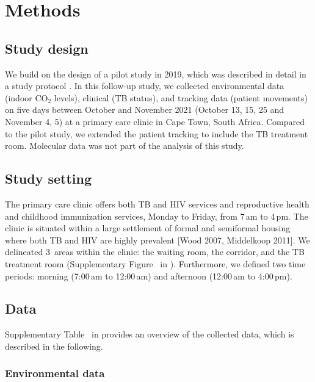 \documentclass[fleqn,11pt]{wlscirep}
\begin{document}
\newpage

\section{Methods}

\subsection{Study design}

We build on the design of a pilot study in 2019\cite{Zurcher2022JID}, which was described in detail in a study protocol \cite{Zurcher2020BMJ}. In this follow-up study, we collected environmental data (indoor CO$_2$ levels), clinical (TB status), and tracking data (patient movements) on five days between October and November 2021 (October 13, 15, 25 and November 4, 5) at a primary care clinic in Cape Town, South Africa. Compared to the pilot study, we extended the patient tracking to include the TB treatment room. Molecular data was not part of the analysis of this study. 

\subsection{Study setting}

The primary care clinic offers both TB and HIV services and reproductive health and childhood immunization services, Monday to Friday, from 7\,am to 4\,pm. The clinic is situated within a large settlement of formal and semiformal housing where both TB and HIV are highly prevalent\cite{Wood2007AMJRCCD,Middelkoop2011JAIDS} [Wood 2007, Middelkoop 2011]. We delineated 3~areas within the clinic: the waiting room, the corridor, and the TB treatment room (Supplementary Figure~ in \supp). Furthermore, we defined two time periods: morning (7:00\,am to 12:00\,am) and afternoon (12:00\,am to 4:00\,pm). 

\subsection{Data}

Supplementary Table~ in \supp provides an overview of the collected data, which is described in the following.

\subsubsection{Environmental data}
\end{document}
